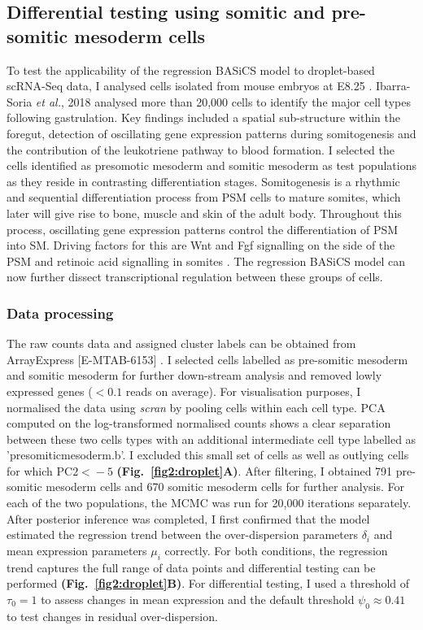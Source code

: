 \newpage

\subsection{Differential testing using somitic and pre-somitic mesoderm cells}

To test the applicability of the regression BASiCS model to droplet-based scRNA-Seq data, I analysed cells isolated from mouse embryos at E8.25 \citep{Ibarra-Soria2018}. 
Ibarra-Soria \emph{et al.}, 2018 analysed more than 20,000 cells to identify the major cell types following gastrulation. 
Key findings included a spatial sub-structure within the foregut, detection of oscillating gene expression patterns during somitogenesis and the contribution of the leukotriene pathway to blood formation. 
I selected the cells identified as presomotic mesoderm and somitic mesoderm as test populations as they reside in contrasting differentiation stages. 
Somitogenesis is a rhythmic and sequential differentiation process from \gls{PSM} cells to mature somites, which later will give rise to bone, muscle and skin of the adult body. 
Throughout this process, oscillating gene expression patterns control the differentiation of PSM into \gls{SM}. 
Driving factors for this are Wnt and \gls{Fgf} signalling on the side of the PSM and retinoic acid signalling in somites \cite{Oates2012}. 
The regression BASiCS model can now further dissect transcriptional regulation between these groups of cells.

\subsubsection{Data processing}

The raw counts data and assigned cluster labels can be obtained from ArrayExpress [E-MTAB-6153] \citep{Ibarra-Soria2018}. 
I selected cells labelled as pre-somitic mesoderm and somitic mesoderm for further down-stream analysis and removed lowly expressed genes ($< 0.1$ reads on average). 
For visualisation purposes, I normalised the data using \emph{scran} by pooling cells within each cell type. 
PCA computed on the log-transformed normalised counts shows a clear separation between these two cells types with an additional intermediate cell type labelled as 'presomiticmesoderm.b'. 
I excluded this small set of cells as well as outlying cells for which $\text{PC2}{}<{}-5$ \textbf{(Fig.~\ref{fig2:droplet}A)}. 
After filtering, I obtained 791 pre-somitic mesoderm cells and 670 somitic mesoderm cells for further analysis. For each of the two populations, the MCMC was run for 20,000 iterations separately. 
After posterior inference was completed, I first confirmed that the model estimated the regression trend between the over-dispersion parameters $\delta_i$ and mean expression parameters $\mu_i$ correctly. 
For both conditions, the regression trend captures the full range of data points and differential testing can be performed \textbf{(Fig.~\ref{fig2:droplet}B)}. 
For differential testing, I used a threshold of $\tau_0=1$ to assess changes in mean expression and the default threshold $\psi_0\approx{}0.41$ to test changes in residual over-dispersion.  

